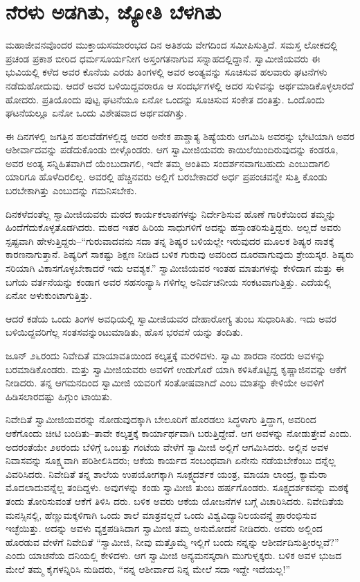 
\chapter{ನೆರಳು ಅಡಗಿತು, ಜ್ಯೋತಿ ಬೆಳಗಿತು}

\noindent

ಮಹಾಜೀವನವೊಂದರ ಮುಕ್ತಾಯಸಮಾರಂಭದ ದಿನ ಅತಿಶಯ ವೇಗದಿಂದ ಸಮೀಪಿಸುತ್ತಿದೆ. ಸಮಸ್ತ ಲೋಕದಲ್ಲಿ ಪ್ರಚಂಡ ಪ್ರಕಾಶ ಬೀರಿದ ಧರ್ಮಸೂರ್ಯನೀಗ ಅಸ್ತಂಗತನಾಗುವ ಸನ್ನಾಹದಲ್ಲಿದ್ದಾನೆ. ಸ್ವಾಮೀಜಿಯವರು ಈ ಭುವಿಯಲ್ಲಿ ಕಳೆದ ಅವರ ಕೊನೆಯ ಎರಡು ತಿಂಗಳಲ್ಲಿ ಅವರ ಅಂತ್ಯವನ್ನು ಸೂಚಿಸುವ ಹಲವಾರು ಘಟನೆಗಳು ನಡೆದುಹೋದುವು. ಆದರೆ ಅವರ ಬಳಿಯಿದ್ದವರಾರೂ ಆ ಸಂದರ್ಭಗಳಲ್ಲಿ ಅದರ ಸುಳಿವನ್ನು ಅರ್ಥಮಾಡಿಕೊಳ್ಳಲಾರದೆ ಹೋದರು. ಪ್ರತಿಯೊಂದು ಪುಟ್ಟ ಘಟನೆಯೂ ಏನೋ ಒಂದನ್ನು ಸೂಚಿಸುವ ಸಂಕೇತ ದಂತಿತ್ತು. ಒಂದೊಂದು ಘಟನೆಯಲ್ಲೂ ಏನೋ ಒಂದು ವಿಶೇಷವಾದ ಅರ್ಥವಡಗಿತ್ತು.

ಈ ದಿನಗಳಲ್ಲಿ ಜಗತ್ತಿನ ಹಲವೆಡೆಗಳಲ್ಲಿದ್ದ ಅವರ ಅನೇಕ ಪಾಶ್ಚಾತ್ಯ ಶಿಷ್ಯೆಯರು ಆಗಮಿಸಿ ಅವರನ್ನು ಭೇಟಿಯಾಗಿ ಅವರ ಆಶೀರ್ವಾದವನ್ನು ಪಡೆದುಕೊಂಡು ಬೀಳ್ಗೊಂಡರು. ಆಗ ಸ್ವಾಮೀಜಿಯವರು ಕಾಯಿಲೆಯಿಂದಿರುವುದನ್ನು ಕಂಡರೂ, ಅವರ ಅಂತ್ಯ ಸನ್ನಿಹಿತವಾಗಿದೆ ಯೆಂಬುದಾಗಲಿ, ಇದೇ ತಮ್ಮ ಅಂತಿಮ ಸಂದರ್ಶನವಾಗಬಹುದು ಎಂಬುದಾಗಲಿ ಯಾರಿಗೂ ಹೊಳೆದಿರಲಿಲ್ಲ. ಅವರಲ್ಲಿ ಹೆಚ್ಚಿನವರು ಅಲ್ಲಿಗೆ ಬರಬೇಕಾದರೆ ಅರ್ಧ ಪ್ರಪಂಚವನ್ನೇ ಸುತ್ತಿ ಕೊಂಡು ಬರಬೇಕಾಗಿತ್ತು ಎಂಬುದನ್ನು ಗಮನಿಸಬೇಕು.

ದಿನಕಳೆದಂತೆಲ್ಲ ಸ್ವಾಮೀಜಿಯವರು ಮಠದ ಕಾರ್ಯಕಲಾಪಗಳನ್ನು ನಿರ್ದೇಶಿಸುವ ಹೊಣೆ ಗಾರಿಕೆಯಿಂದ ತಮ್ಮನ್ನು ಹಿಂದೆಗೆದುಕೊಳ್ಳತೊಡಗಿದರು. ಮಠದ ಇತರ ಹಿರಿಯ ಸಾಧುಗಳಿಗೆ ಅದನ್ನು ಹಸ್ತಾಂತರಿಸುತ್ತಿದ್ದರು. ಅಲ್ಲದೆ ಅವರು ಸ್ಪಷ್ಟವಾಗಿ ಹೇಳುತ್ತಿದ್ದರು–“ಗುರುವಾದವನು ಸದಾ ತನ್ನ ಶಿಷ್ಯರ ಬಳಿಯಲ್ಲೇ ಇರುವುದರ ಮೂಲಕ ಶಿಷ್ಯರ ನಾಶಕ್ಕೆ ಕಾರಣನಾಗುತ್ತಾನೆ. ಶಿಷ್ಯರಿಗೆ ಸಾಕಷ್ಟು ಶಿಕ್ಷಣ ನೀಡಿದ ಬಳಿಕ ಗುರುವು ಅವರಿಂದ ದೂರವಾಗುವುದು ಶ್ರೇಯಸ್ಕರ. ಶಿಷ್ಯರು ಸರಿಯಾಗಿ ವಿಕಾಸಗೊಳ್ಳಬೇಕಾದರೆ ಇದು ಆವಶ್ಯಕ.” ಸ್ವಾಮೀಜಿಯವರ ಇಂತಹ ಮಾತುಗಳನ್ನು ಕೇಳಿದಾಗ ಮತ್ತು ಈ ಬಗೆಯ ವರ್ತನೆಯನ್ನು ಕಂಡಾಗ ಅವರ ಸಹಸಂನ್ಯಾಸಿ ಗಳಿಗೆಲ್ಲ ಅನಿರ್ವಚನೀಯ ಸಂಕಟವಾಗುತ್ತಿತ್ತು. ಎದೆಯಲ್ಲಿ ಏನೋ ಅಳುಕುಂಟಾಗುತ್ತಿತ್ತು.

ಆದರೆ ಕಡೆಯ ಒಂದು ತಿಂಗಳ ಅವಧಿಯಲ್ಲಿ ಸ್ವಾಮೀಜಿಯವರ ದೇಹಾರೋಗ್ಯ ತುಂಬ ಸುಧಾರಿಸಿತು. ಇದು ಅವರ ಬಳಿಯಿದ್ದವರಿಗೆಲ್ಲ ಸಂತಸವನ್ನುಂಟುಮಾಡಿತು, ಹೊಸ ಭರವಸೆ ಯನ್ನು ತಂದಿತು.

ಜೂನ್ ೨೬ರಂದು ನಿವೇದಿತೆ ಮಾಯಾವತಿಯಿಂದ ಕಲ್ಕತ್ತಕ್ಕೆ ಮರಳಿದಳು. ಸ್ವಾಮಿ ಶಾರದಾ ನಂದರು ಅವಳನ್ನು ಬರಮಾಡಿಕೊಂಡರು. ಮತ್ತು ಸ್ವಾಮೀಜಿಯವರು ಅವಳಿಗೆ ಉಡುಗೊರೆ ಯಾಗಿ ಕಳಿಸಿಕೊಟ್ಟಿದ್ದ ಕೃಷ್ಣಾಜಿನವನ್ನು ಆಕೆಗೆ ನೀಡಿದರು. ತನ್ನ ಆಗಮನದಿಂದ ಸ್ವಾಮೀಜಿ ಯವರಿಗೆ ಸಂತೋಷವಾಗಿದೆ ಎಂಬ ಮಾತನ್ನು ಕೇಳಿಯೇ ಅವಳಿಗೆ ಹಿಡಿಸಲಾರದಷ್ಟು ಹಿಗ್ಗುಂ ಟಾಯಿತು.

ನಿವೇದಿತೆ ಸ್ವಾಮೀಜಿಯವರನ್ನು ನೋಡುವುದಕ್ಕಾಗಿ ಬೇಲೂರಿಗೆ ಹೊರಡಲು ಸಿದ್ಧಳಾಗು ತ್ತಿದ್ದಾಗ, ಅವರಿಂದ ಆಕೆಗೊಂದು ಚೀಟಿ ಬಂದಿತು–ತಾವೇ ಕಲ್ಕತ್ತಕ್ಕೆ ಕಾರ್ಯಾರ್ಥವಾಗಿ ಬರುತ್ತಿದ್ದೇವೆ. ಆಗ ಅವಳನ್ನು ನೋಡುತ್ತೇವೆ ಎಂದು. ಅದರಂತೆಯೇ ೨೮ರಂದು ಬೆಳಿಗ್ಗೆ ಒಂಬತ್ತು ಗಂಟೆಯ ವೇಳೆಗೆ ಸ್ವಾಮೀಜಿ ಅಲ್ಲಿಗೆ ಆಗಮಿಸಿದರು. ಅಲ್ಲಿನ ಅವಳ ನಿವಾಸವನ್ನು ಸೂಕ್ಷ್ಮವಾಗಿ ಪರಿಶೀಲಿಸಿದರು; ಆಕೆಯ ಕಾರ್ಯದ ಸಂಬಂಧವಾಗಿ ಏನೇನು ನಡೆಯಬೇಕೆಂಬು ದನ್ನೆಲ್ಲ ವಿವರಿಸಿದರು. ನಿವೇದಿತೆ ತನ್ನ ಶಾಲೆಯ ಉಪಯೋಗಕ್ಕಾಗಿ ಸೂಕ್ಷ್ಮದರ್ಶಕ ಯಂತ್ರ, ಮಾಯಾ ಲಾಂದ್ರ, ಕ್ಯಾಮೆರಾ ಮೊದಲಾದುವನ್ನೆಲ್ಲ ತಂದಿದ್ದಳು. ಅವುಗಳನ್ನು ಕಂಡು ಸ್ವಾಮೀಜಿ ತುಂಬ ಹರ್ಷಗೊಂಡರು. ಸೂಕ್ಷ್ಮದರ್ಶಕವನ್ನು ಮಠಕ್ಕೆ ತಂದು ತೋರಿಸುವಂತೆ ಆಕೆಗೆ ತಿಳಿಸಿ ದರು. ಬಳಿಕ ಅವರು ಆಕೆಯ ಯೋಜನೆಗಳ ಬಗ್ಗೆ ವಿಚಾರಿಸಿದರು. ನಿವೇದಿತೆಯ ಮನಸ್ಸಿನಲ್ಲಿ, ಹೆಣ್ಣುಮಕ್ಕಳಿಗಾಗಿ ಒಂದು ಶಾಲೆ ಮಾತ್ರವಲ್ಲದೆ ಒಂದು ವಿಶ್ವವಿದ್ಯಾನಿಲಯವನ್ನೆ ಪ್ರಾರಂಭಿಸುವ ಇಚ್ಛೆಯಿತ್ತು. ಅದನ್ನು ಅವಳು ವ್ಯಕ್ತಪಡಿಸಿದಾಗ ಸ್ವಾಮೀಜಿ ತಮ್ಮ ಅನುಮೋದನೆ ನೀಡಿದರು. ಅವರು ಅಲ್ಲಿಂದ ಹೊರಡುವ ವೇಳೆಗೆ ನಿವೇದಿತೆ “ಸ್ವಾಮೀಜಿ, ನೀವು ಮತ್ತೊಮ್ಮೆ ಇಲ್ಲಿಗೆ ಬಂದು ನನ್ನನ್ನು ಆಶೀರ್ವದಿಸುತ್ತೀರಲ್ಲವೆ?” ಎಂದು ಯಾಚನೆಯ ದನಿಯಲ್ಲಿ ಕೇಳಿದಳು. ಆಗ ಸ್ವಾಮೀಜಿ ಅನ್ಯಮನಸ್ಕರಾಗಿ ಮುಗುಳ್ನಕ್ಕರು. ಬಳಿಕ ಅವಳ ಭುಜದ ಮೇಲೆ ತಮ್ಮ ಕೈಗಳನ್ನಿರಿಸಿ ನುಡಿದರು, “ನನ್ನ ಆಶೀರ್ವಾದ ನಿನ್ನ ಮೇಲೆ ಸದಾ ಇದ್ದೇ ಇದೆಯಲ್ಲ!”

